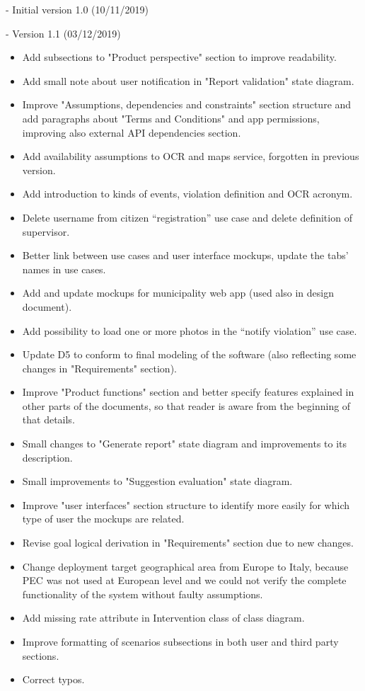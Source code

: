 - Initial version 1.0 (10/11/2019)

- Version 1.1 (03/12/2019)
\begin{itemize}
	\item Add subsections to "Product perspective" section to improve readability.
	\item Add small note about user notification in "Report validation" state diagram. 
	\item Improve "Assumptions, dependencies and constraints" section structure and add paragraphs about "Terms and Conditions" and app permissions, improving also external API dependencies section.
	\item Add availability assumptions to OCR and maps service, forgotten in previous version.
	\item Add introduction to kinds of events, violation definition and OCR acronym.
	\item Delete username from citizen “registration” use case and delete definition of supervisor.
	\item Better link between use cases and user interface mockups, update the tabs’ names in use cases.
	\item Add and update mockups for municipality web app (used also in design document).
	\item Add possibility to load one or more photos in the “notify violation” use case.
	\item Update D5 to conform to final modeling of the software (also reflecting some changes in "Requirements" section).
	\item Improve "Product functions" section and better specify features explained in other parts of the documents, so that reader is aware from the beginning of that details.
	\item Small changes to "Generate report" state diagram and improvements to its description.
	\item Small improvements to "Suggestion evaluation" state diagram.
	\item Improve "user interfaces" section structure to identify more easily for which type of user the mockups are related.
	\item Revise goal logical derivation in "Requirements" section due to new changes.
	\item Change deployment target geographical area from Europe to Italy, because PEC was not used at European level and we could not verify the complete functionality of the system without faulty assumptions.  
	\item Add missing rate attribute in Intervention class of class diagram.
	\item Improve formatting of scenarios subsections in both user and third party sections.
	\item Correct typos.
\end{itemize}

